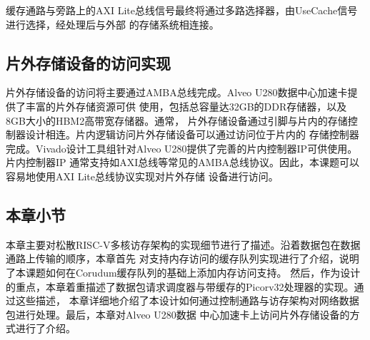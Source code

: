 缓存通路与旁路上的AXI Lite总线信号最终将通过多路选择器，由UseCache信号进行选择，经处理后与外部
的存储系统相连接。

\subsection{片外存储设备的访问实现}

片外存储设备的访问将主要通过AMBA总线完成。Alveo U280数据中心加速卡提供了丰富的片外存储资源可供
使用，包括总容量达32GB的DDR存储器，以及8GB大小的HBM2高带宽存储器\cite{alveo2021datasheet}。通常，
片外存储设备通过引脚与片内的存储控制器设计相连。片内逻辑访问片外存储设备可以通过访问位于片内的
存储控制器完成。Vivado设计工具组针对Alveo U280提供了完善的片内控制器IP可供使用。片内控制器IP
通常支持如AXI总线等常见的AMBA总线协议。因此，本课题可以容易地使用AXI Lite总线协议实现对片外存储
设备进行访问。

\subsection{本章小节}

本章主要对松散RISC-V多核访存架构的实现细节进行了描述。沿着数据包在数据通路上传输的顺序，本章首先
对支持内存访问的缓存队列实现进行了介绍，说明了本课题如何在Corudum缓存队列的基础上添加内存访问支持。
然后，作为设计的重点，本章着重描述了数据包请求调度器与带缓存的Picorv32处理器的实现。通过这些描述，
本章详细地介绍了本设计如何通过控制通路与访存架构对网络数据包进行处理。最后，本章对Alveo U280数据
中心加速卡上访问片外存储设备的方式进行了介绍。
